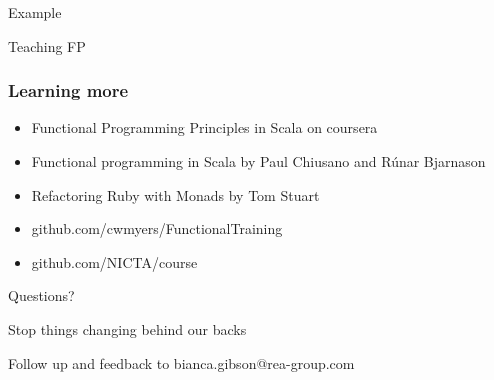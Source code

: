 \documentclass[aspectratio=169]{beamer}
\begin{document}
\begin{frame}
  \begin{center}
    \Huge Example
  \end{center}
\end{frame}

\begin{frame}
  \begin{center}
    \Huge Teaching FP
  \end{center}
\end{frame}

\begin{frame}
  \frametitle{Learning more}
  \begin{itemize}
    \item Functional Programming Principles in Scala on coursera
    \item Functional programming in Scala by Paul Chiusano and Rúnar Bjarnason
    \item Refactoring Ruby with Monads by Tom Stuart
    \item github.com/cwmyers/FunctionalTraining
    \item github.com/NICTA/course
  \end{itemize}
\end{frame}

\begin{frame}
  \begin{center}
    \Huge Questions?
  \end{center}
\end{frame}

\begin{frame}
  \begin{center}
    \Huge Stop things changing behind our backs
  \end{center}
\end{frame}

\begin{frame}
  \begin{center}
    \Huge Follow up and feedback to bianca.gibson@rea-group.com
  \end{center}
\end{frame}
\end{document}
